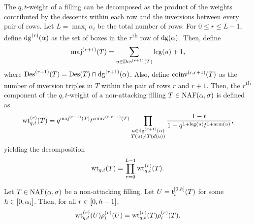 The \(q,t\)-weight of a filling can be decomposed as the product of the weights contributed by the descents within each row and the inversions between every pair of rows.
Let \(L = \max_i \alpha_i\) be the total number of rows.
For \(0\leq r\leq L-1\),
define \(\dg[r]{(\alpha)}\) as
the set of boxes in the \(r\)\textsuperscript{th} row of \(\dg(\alpha)\).
Then, define
\begin{equation*}
	\maj[r + 1](T) = \sum_{u \in \Des[r + 1](T)} \leg(u) + 1,
\end{equation*}
where \(\Des[r+1](T)=\Des(T)\cap \dg[r+1]{(\alpha)}\).
Also, define \(\coinv[r, r+1](T)\) as
the number of inversion triples in \(T\)
within the pair of rows \(r\) and \(r + 1\).
Then, the \(r\)\textsuperscript{th} component
of the \(q, t\)-weight
of a non-attacking filling \(T \in \NAF(\alpha, \sigma)\)
is defined as
\begin{equation}
	\label{eq:rthcomponent}
	\wtqt[r](T) =
	q^{\maj[r + 1](T)}
	t^{\coinv[r, r + 1](T)}
	\prod_{\substack{u \in \dg[r + 1]{(\alpha)} \\ T(u) \neq T(\south{u})}}
	\frac{1 - t}{1 - q^{1 + \leg(u)} t^{1 + \arm(u)}},
\end{equation}
yielding the decomposition
\begin{equation*}
	\wtqt(T) = \prod_{r = 0}^{L-1} \wtqt[r](T).
\end{equation*}

\begin{lemma} \label{lemma:wtqt-prob-balanced-r}
	Let \(T \in \NAF(\alpha, \sigma)\) be a non-attacking filling.
	Let \(U = \sswap[0, h]{i}(T)\) for some \(h \in [0, \alpha_i]\).
	Then, for all \(r \in [0, h - 1]\),
	\begin{equation} \label{eq:wtqt-prob-balanced-r}
		\wtqt[r](U)\pp[r]{i}(U) = \wtqt[r](T)\pp[r]{i}(T).
	\end{equation}
\end{lemma}

